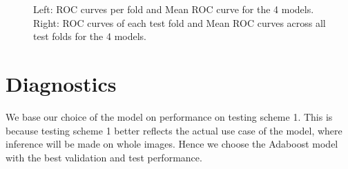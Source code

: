 \documentclass[11pt, letterpaper, journal]{IEEEtran}
\begin{document}
\begin{figure}%
    \centering
    \qquad
    \caption{Left: ROC curves per fold and Mean ROC curve for the 4 models. Right: ROC curves of each test fold and Mean ROC curves across all test folds for the 4 models. }%
    \label{fig:ROC_curves scheme2}%
\end{figure}


\section{Diagnostics}
We base our choice of the model on performance on testing scheme 1. This is because testing scheme 1 better reflects the actual use case of the model, where inference will be made on whole images. Hence we choose the Adaboost model with the best validation and test performance.
\end{document}
